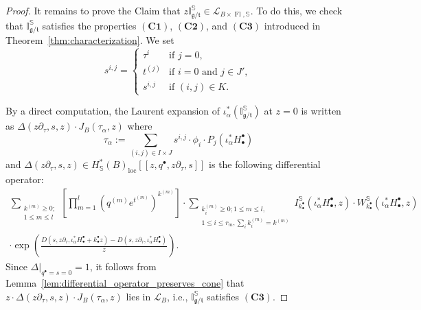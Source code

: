 \documentclass[a4paper,12pt]{amsart}
\numberwithin{equation}{section}
\theoremstyle{definition}
\newcommand{\I}{\mathbb{I}}
\newcommand{\bbS}{\mathbb{S}}
\newcommand{\cL}{\mathcal{L}}
\newcommand{\gt}{{\mathfrak{g}/\mathfrak{t}}}
\newcommand{\loc}{{\operatorname{loc}}}
\newcommand{\Fl}{\operatorname{Fl}}
\begin{document}
\begin{proof}
    It remains to prove the Claim that $z\I_\gt^\bbS\in\cL_{B\times\Fl,\bbS}$. To do this, we check that $\I_\gt^\bbS$ satisfies the properties $\mathbf{(C1)}$, $\mathbf{(C2)}$, and $\mathbf{(C3)}$ introduced in Theorem~\ref{thm:characterization}.
    We set 
    \begin{equation*}
        s^{i,j} = 
        \begin{cases}
        \tau^i  & \text{if $j=0$}, \\
        t^{(j)} & \text{if $i=0$ and $j\in J'$},   \\
        s^{i,j} & \text{if $(i,j)\in K$}.
        \end{cases}
    \end{equation*}

    By a direct computation, the Laurent expansion of $\iota_\alpha^*(\I^\bbS_\gt)$ at $z=0$ is written as $\Delta(z\partial_\tau,s,z)\cdot J_B(\tau_\alpha,z)$ where 
    \[
    \tau_\alpha := \sum_{(i,j)\in I\times J} s^{i,j}\cdot\phi_i \cdot P_j(\iota_\alpha^*H_\bullet^\bullet)
    \]
    and $\Delta(z\partial_\tau,s,z) \in H^*_\bbS(B)_\loc[\![z,q^\bullet,z\partial_\tau,s]\!]$ is the following differential operator:
    \begin{multline*}
    \sum_{ \substack{k^{(m)}\geq0; \\1\leq m\leq l} } \left[ \prod_{m=1}^l (q^{(m)}e^{t^{(m)}})^{k^{(m)}} \right] \cdot \sum_{ \substack{k_i^{(m)}\geq0; 1\leq m\leq l, \\ 1\leq i\leq r_m,\sum_ik_i^{(m)}=k^{(m)}} } I^\bbS_{k_\bullet^\bullet}(\iota_\alpha^*H_\bullet^\bullet,z) \cdot W_{k_\bullet^\bullet}^\bbS(\iota_\alpha^*H_\bullet^\bullet,z) \\
    \cdot \exp\left( \frac{D(s,z\partial_\tau,\iota_\alpha^*H_\bullet^\bullet+k_\bullet^\bullet z)-D(s,z\partial_\tau,\iota_\alpha^*H_\bullet^\bullet)}{z} \right).
    \end{multline*}
    Since $\Delta|_{q^\bullet=s=0}=1$, it follows from Lemma~\ref{lem:differential_operator_preserves_cone} that $z\cdot\Delta(z\partial_\tau,s,z)\cdot J_B(\tau_\alpha,z)$ lies in $\cL_B$, i.e., $\I^\bbS_\gt$ satisfies $\mathbf{(C3)}$.


\end{proof}
\end{document}

